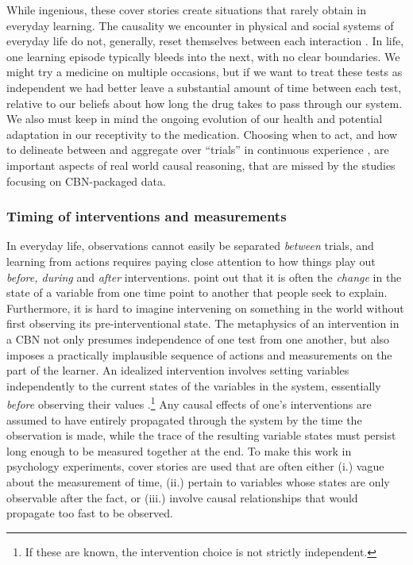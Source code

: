 \documentclass{cambridge7A}%
\begin{document}
While ingenious, these cover stories create situations that rarely obtain in everyday learning.  The causality we encounter in physical and social systems of everyday life do not, generally, reset themselves between each interaction \citep{greville2007influence,rottman2016searching}.  In life, one learning episode typically bleeds into the next, with no clear boundaries.  We might try a medicine on multiple occasions, but if we want to treat these tests as independent we had better leave a substantial amount of time between each test, relative to our beliefs about how long the drug takes to pass through our system.  We also must keep in mind the ongoing evolution of our health and potential adaptation in our receptivity to the medication. Choosing when to act, and how to delineate between and aggregate over ``trials'' in continuous experience \citep[cf][]{tulving1972episodic,gallistel2000time}, are important aspects of real world causal reasoning, that are missed by the studies focusing on CBN-packaged data.


\subsubsection{Timing of interventions and measurements}

In everyday life, observations cannot easily be separated \emph{between} trials, and learning from actions requires paying close attention to how things play out \emph{before, during} and \emph{after} interventions.   \cite{rottman2012causal} point out that it is often the \emph{change} in the state of a variable from one time point to another that people seek to explain.  Furthermore, it is hard to imagine intervening on something in the world without first observing its pre-interventional state.  The metaphysics of an intervention in a CBN not only presumes independence of one test from one another, but also imposes a practically implausible sequence of actions and measurements on the part of the learner.  An idealized intervention involves setting variables independently to the current states of the variables in the system, essentially \emph{before} observing their values \citep{pearl2000causality}.\footnote{If these are known, the intervention choice is not strictly independent.}  Any causal effects of one's interventions are assumed to have entirely propagated through the system by the time the observation is made, while the trace of the resulting variable states must persist long enough to be measured together at the end.  
To make this work in psychology experiments, cover stories are used that are often either (i.) vague about the measurement of time, (ii.) pertain to variables whose states are only observable after the fact, or (iii.) involve causal relationships that would propagate too fast to be observed.  
\end{document}
